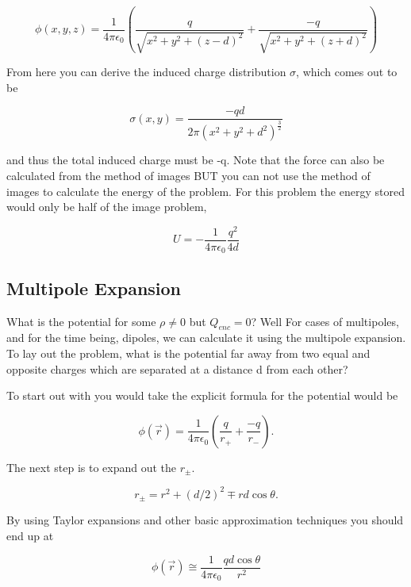 \documentclass[preprint, review,12pt]{elsarticle}
\begin{document}
\begin{equation}
    \phi(x,y,z) = \frac{1}{4 \pi \epsilon_0}(\frac{q}{\sqrt{x^2+y^2+(z-d)^2}} + \frac{-q}{\sqrt{x^2+y^2+(z+d)^2}})
\end{equation}

From here you can derive the induced charge distribution $\sigma$, which comes out to be

\begin{equation}
    \sigma(x,y) = \frac{-qd}{2\pi (x^2+y^2+d^2)^{\frac{3}{2}}}
\end{equation}

and thus the total induced charge must be -q. Note that the force can also be calculated from the method of images BUT you can not use the method of images to calculate the energy of the problem. For this problem the energy stored would only be half of the image problem,

\begin{equation}
    U = -\frac{1}{4 \pi \epsilon_0}\frac{q^2}{4d}
\end{equation}

\subsection{Multipole Expansion}

What is the potential for some $\rho \neq 0$ but $Q_{enc} = 0$? Well For cases of multipoles, and for the time being, dipoles, we can calculate it using the multipole expansion. To lay out the problem, what is the potential far away from two equal and opposite charges which are separated at a distance d from each other?

To start out with you would take the explicit formula for the potential would be 

\begin{equation}
    \phi(\vec{r}) = \frac{1}{4\pi \epsilon_0}(\frac{q}{r_+}+\frac{-q}{r_-}).
\end{equation}

The next step is to expand out the $r_\pm$.

\begin{equation}
    r_\pm = r^2 + (d/2)^2 \mp rd\cos\theta.
\end{equation}

By using Taylor expansions and other basic approximation techniques you should end up at

\begin{equation}
    \phi(\vec{r}) \cong \frac{1}{4 \pi \epsilon_0}\frac{qd\cos\theta}{r^2}
\end{equation}
\end{document}
